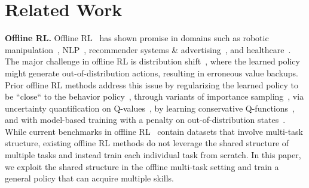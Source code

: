 \section{Related Work}

\textbf{Offline RL.} Offline RL~\citep{ernst2005tree, riedmiller2005neural, LangeGR12, levine2020offline} has shown promise in domains such as robotic manipulation~\citep{kalashnikov2018scalable, mandlekar2020iris, Rafailov2020LOMPO,singh2020cog,kalashnikov2021mt}, NLP~\citep{jaques2019way,jaques2020human}, recommender systems \& advertising~\citep{strehl2010learning,garcin2014offline,charles2013counterfactual,theocharous2015ad,thomas2017predictive}, and healthcare~\citep{shortreed2011informing, Wang2018SupervisedRL}. The major challenge in offline RL is distribution shift~\citep{fujimoto2018off,kumar2019stabilizing,kumar2020conservative}, where the learned policy might generate out-of-distribution actions, resulting in erroneous value backups. Prior offline RL methods address this issue by regularizing the learned policy to be ``close`` to the behavior policy~\citep{fujimoto2018off,liu2020provably,jaques2019way,wu2019behavior, zhou2020plas,kumar2019stabilizing,siegel2020keep, peng2019advantage}, through variants of importance sampling~\citep{precup2001off, sutton2016emphatic, LiuSAB19, SwaminathanJ15, nachum2019algaedice}, via uncertainty quantification on Q-values~\citep{agarwal2020optimistic, kumar2019stabilizing, wu2019behavior, levine2020offline}, by learning conservative Q-functions~\citep{kumar2020conservative,kostrikov2021offline}, and with model-based training with a penalty on out-of-distribution states~\citep{kidambi2020morel, yu2020mopo,matsushima2020deployment,argenson2020model,swazinna2020overcoming,Rafailov2020LOMPO,lee2021representation,yu2021combo}. While current benchmarks in offline RL~\citep{fu2020d4rl,gulcehre2020rl} contain datasets that involve multi-task structure, existing offline RL methods do not leverage the shared structure of multiple tasks and instead train each individual task from scratch. In this paper, we exploit the shared structure in the offline multi-task setting and train a general policy that can acquire multiple skills.

